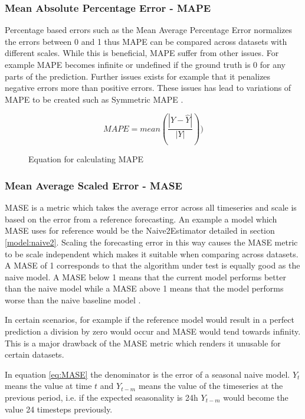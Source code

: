 \subsubsection{Mean Absolute Percentage Error - MAPE}
Percentage based errors such as the Mean Average Percentage Error normalizes the errors between 0 and 1 thus MAPE can be compared across datasets with different scales. While this is beneficial, MAPE suffer from other issues. For example MAPE becomes infinite or undefined if the ground truth is 0 for any parts of the prediction. Further issues exists for example that it penalizes negative errors more than positive errors. These issues has lead to variations of MAPE to be created such as Symmetric MAPE \cite{hyndman_forecasting_3rd,gluonts-github}.

\begin{figure}[h]
    \[MAPE = mean(\frac{|Y - \hat{Y}|}{|Y|}))\]
    \caption{Equation for calculating MAPE}
    \label{eq:MAPE}
\end{figure}

\subsubsection{Mean Average Scaled Error - MASE}
MASE is a metric which takes the average error across all timeseries and scale is based on the error from a reference forecasting. An example a model which MASE uses for reference would be the Naive2Estimator detailed in section \ref{model:naive2}. Scaling the forecasting error in this way causes the MASE metric to be scale independent which makes it suitable when comparing across datasets. A MASE of 1 corresponds to that the algorithm under test is equally good as the naive model. A MASE below 1 means that the current model performs better than the naive model while a MASE above 1 means that the model performs worse than the naive baseline model \cite{hyndman_forecasting_3rd,gluonts-github}.

In certain scenarios, for example if the reference model would result in a perfect prediction a division by zero would occur and MASE would tend towards infinity. This is a major drawback of the MASE metric which renders it unusable for certain datasets.

In equation \ref{eq:MASE} the denominator is the error of a seasonal naive model. \(Y_t\) means the value at time \(t\) and \(Y_{t-m}\) means the value of the timeseries at the previous period, i.e. if the expected seasonality is 24h \(Y_{t-m}\) would become the value 24 timesteps previously.

